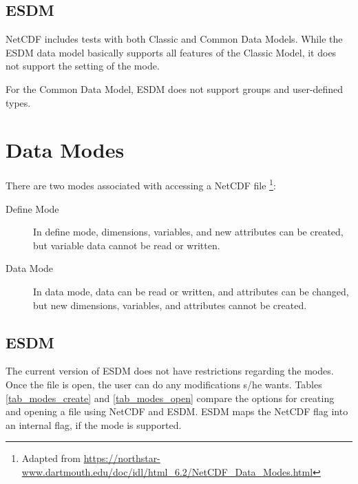 \subsection{ESDM}

NetCDF includes tests with both Classic and Common Data Models. While the ESDM data model basically supports all features of the Classic Model, it does not support the setting of the mode.

For the Common Data Model, ESDM does not support groups and user-defined types.


\section{Data Modes}

{\itshape

There are two modes associated with accessing a NetCDF file \footnote{Adapted from \url{https://northstar-www.dartmouth.edu/doc/idl/html_6.2/NetCDF_Data_Modes.html}}:

\begin{description}

\item[Define Mode] In define mode, dimensions, variables, and new attributes can be created, but variable data cannot be read or written.

\item[Data Mode] In data mode, data can be read or written, and attributes can be changed, but new dimensions, variables, and attributes cannot be created.

\end{description}

}

\subsection{ESDM}

The current version of ESDM does not have restrictions regarding the modes. Once the file is open, the user can do any modifications s/he wants. Tables \ref{tab_modes_create} and \ref{tab_modes_open} compare the options for creating and opening a file using NetCDF and ESDM. ESDM maps the NetCDF flag into an internal flag, if the mode is supported.

